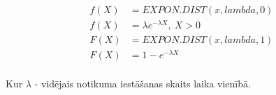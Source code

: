 
{\begin{align*}
    f(X) &= EXPON.DIST(x, lambda, 0)\\
    f(X) &= \lambda e^{-\lambda X}, \> X > 0\\
    F(X) &= EXPON.DIST(x, lambda, 1)\\
    F(X) &= 1 -  e^{-\lambda X} \\
\end{align*}

Kur $\lambda$ - vidējais notikuma iestāšanas skaits laika vienībā.
}

